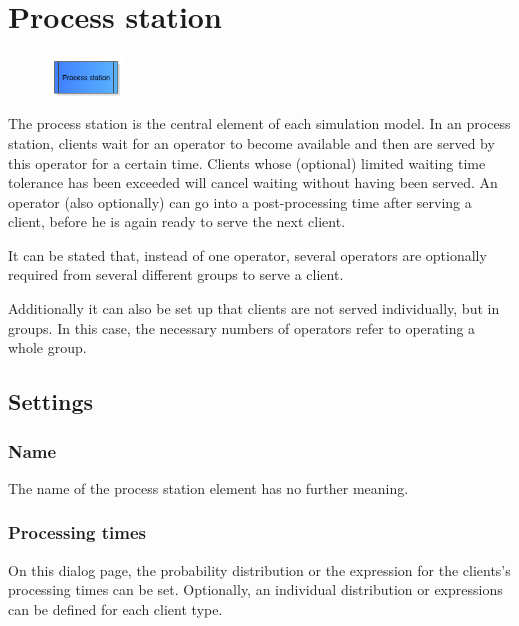 \section{Process station}
\label{ref:ModelElementProcess}

\begin{figure}
\vspace{-22pt}
\includegraphics[width=2cm]{imageModelElementProcess.png}
\vspace{-22pt}
\end{figure}

The process station is the central element of each simulation model. In an process station, clients wait for an operator
to become available and then are served by this operator for a certain time. Clients whose (optional) limited waiting time
tolerance has been exceeded will cancel waiting without having been served. An operator (also optionally) can go into
a post-processing time after serving a client, before he is again ready to serve the next client.

It can be stated that, instead of one operator, several operators are optionally required from several different groups
to serve a client.

Additionally it can also be set up that clients are not served individually, but in groups.
In this case, the necessary numbers of operators refer to operating a whole group.

\subsection*{Settings}

\subsubsection*{Name}

The name of the process station element has no further meaning.

\subsubsection*{Processing times}

On this dialog page, the probability distribution or the expression for the clients's processing times can be set.
Optionally, an individual distribution or expressions can be defined for each client type.

